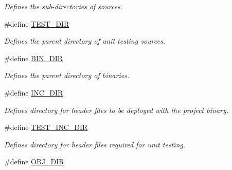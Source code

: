 \begin{DoxyCompactItemize}
\begin{DoxyCompactList}\small\item\em Defines the sub-\/directories of sources. \end{DoxyCompactList}\item 
\hypertarget{group___automatic___variables_gaba8cb34a85a8822c9b79de9cfecd4595}{\#define \hyperlink{group___automatic___variables_gaba8cb34a85a8822c9b79de9cfecd4595}{T\+E\+S\+T\+\_\+\+D\+I\+R}}\label{group___automatic___variables_gaba8cb34a85a8822c9b79de9cfecd4595}

\begin{DoxyCompactList}\small\item\em Defines the parent directory of unit testing sources. \end{DoxyCompactList}\item 
\hypertarget{group___automatic___variables_gae17fcd1b9014452d5d23b21e7be729e3}{\#define \hyperlink{group___automatic___variables_gae17fcd1b9014452d5d23b21e7be729e3}{B\+I\+N\+\_\+\+D\+I\+R}}\label{group___automatic___variables_gae17fcd1b9014452d5d23b21e7be729e3}

\begin{DoxyCompactList}\small\item\em Defines the parent directory of binaries. \end{DoxyCompactList}\item 
\hypertarget{group___automatic___variables_ga462faf854129d378edf6f5ae9b649e98}{\#define \hyperlink{group___automatic___variables_ga462faf854129d378edf6f5ae9b649e98}{I\+N\+C\+\_\+\+D\+I\+R}}\label{group___automatic___variables_ga462faf854129d378edf6f5ae9b649e98}

\begin{DoxyCompactList}\small\item\em Defines directory for header files to be deployed with the project binary. \end{DoxyCompactList}\item 
\hypertarget{group___automatic___variables_gaffb9faa4be2c44d33e8a56d4125927bd}{\#define \hyperlink{group___automatic___variables_gaffb9faa4be2c44d33e8a56d4125927bd}{T\+E\+S\+T\+\_\+\+I\+N\+C\+\_\+\+D\+I\+R}}\label{group___automatic___variables_gaffb9faa4be2c44d33e8a56d4125927bd}

\begin{DoxyCompactList}\small\item\em Defines directory for header files required for unit testing. \end{DoxyCompactList}\item 
\hypertarget{group___automatic___variables_ga89fe815a0420a7fda6a4e106263e122b}{\#define \hyperlink{group___automatic___variables_ga89fe815a0420a7fda6a4e106263e122b}{O\+B\+J\+\_\+\+D\+I\+R}}\label{group___automatic___variables_ga89fe815a0420a7fda6a4e106263e122b}


\end{DoxyCompactItemize}
